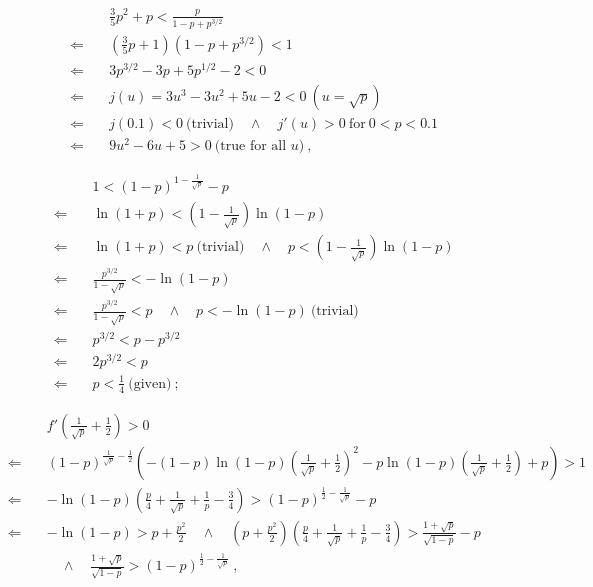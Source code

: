 \documentclass[]{article}
\begin{document}
\begin{align*}
&\frac{3}{5}p^2+p < \frac{p}{1 - p + p^{3/2}}\\
\Longleftarrow\quad&\left(\frac{3}{5}p+1\right)(1 - p + p^{3/2}) < 1\\
\Longleftarrow\quad&  3p^{3/2}- 3p  + 5p^{1/2} -2 < 0\\
\Longleftarrow\quad& j(u) = 3u^3 -3u^2+5u-2 < 0\ (u = \sqrt{p})\\
\Longleftarrow\quad& j(0.1) < 0\ \mbox{(trivial)} \quad\wedge\quad j'(u) > 0 \ \mbox{for}\ 0 < p < 0.1\\
\Longleftarrow\quad& 9u^2 - 6u + 5 > 0 \ \mbox{(true for all $u$)}\ ,
\end{align*}

\begin{align*}
 &1 < (1-p)^{1-\frac{1}{\sqrt{p}}} - p\\
\Longleftarrow\quad& \ln(1 + p) < \left(1-\frac{1}{\sqrt{p}}\right)\ln(1-p)\\
\Longleftarrow\quad& \ln(1 + p) <p\ \mbox{(trivial)}  \quad\wedge\quad p< \left(1-\frac{1}{\sqrt{p}}\right)\ln(1-p)\\
\Longleftarrow\quad&\frac{p^{3/2}}{1-\sqrt{p}}< -\ln(1-p)\\
\Longleftarrow\quad&\frac{p^{3/2}}{1-\sqrt{p}}<p \quad\wedge\quad p< -\ln(1-p)\ \mbox{(trivial)}\\
\Longleftarrow\quad&p^{3/2}<p - p^{3/2}\\
\Longleftarrow\quad&2p^{3/2}<p\\
\Longleftarrow\quad&p<\frac{1}{4} \ \mbox{(given)}\ ;
\end{align*}

\begin{align*}
&f'\left(\frac{1}{\sqrt{p}}+\frac{1}{2}\right) > 0\\
\Longleftarrow\quad& (1-p)^{\frac{1}{\sqrt{p}}-\frac{1}{2}}\left(-(1-p)\ln(1-p)\left(\frac{1}{\sqrt{p}}+\frac{1}{2}\right)^2 - p\ln(1-p)\left(\frac{1}{\sqrt{p}}+\frac{1}{2}\right) + p\right) > 1\\
\Longleftarrow\quad&-\ln(1-p)\left(\frac{p}{4}+\frac{1}{\sqrt{p}}+\frac{1}{p}-\frac{3}{4}\right) > (1-p)^{\frac{1}{2}-\frac{1}{\sqrt{p}}} - p\\
\Longleftarrow\quad&-\ln(1-p) > p + \frac{p^2}{2}  \quad\wedge\quad\left(p + \frac{p^2}{2}\right) \left(\frac{p}{4}+\frac{1}{\sqrt{p}}+\frac{1}{p}-\frac{3}{4}\right) > \frac{1 + \sqrt{p}}{\sqrt{1-p}} - p \\& \quad\wedge\quad \frac{1 + \sqrt{p}}{\sqrt{1-p}} >  (1-p)^{\frac{1}{2}-\frac{1}{\sqrt{p}}}\ ,
\end{align*}
\end{document}
